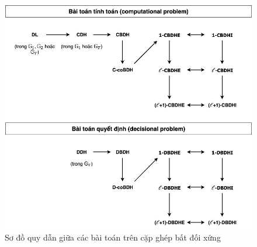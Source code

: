 \documentclass[class=report, crop=false]{standalone}
\begin{document}
			\begin{figure}[h]
				\captionsetup{font=normalsize}
				\includegraphics[width=\textwidth]{assymmetric_problem_reduction.jpg}
				\centering
				\caption{Sơ đồ quy dẫn giữa các bài toán trên cặp ghép bất đối xứng}
				\label{fig:assymmetric_reduction}
			\end{figure}
			\vspace{0.2\baselineskip}
\end{document}

